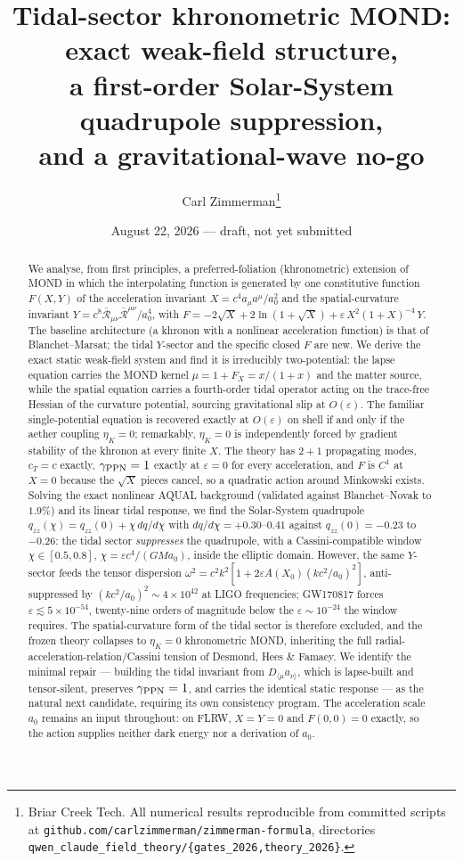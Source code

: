 \documentclass[11pt]{article}
\title{Tidal-sector khronometric MOND: exact weak-field structure,\\
a first-order Solar-System quadrupole suppression,\\
and a gravitational-wave no-go}
\author{Carl Zimmerman\thanks{Briar Creek Tech. All numerical results reproducible from
committed scripts at \texttt{github.com/carlzimmerman/zimmerman-formula},
directories \texttt{qwen\_claude\_field\_theory/\{gates\_2026,theory\_2026\}}.}}
\date{August 22, 2026 --- draft, not yet submitted}
\begin{document}
\maketitle

\begin{abstract}
We analyse, from first principles, a preferred-foliation (khronometric) extension of MOND
in which the interpolating function is generated by one constitutive function
$F(X,Y)$ of the acceleration invariant $X=c^4 a_\mu a^\mu/a_0^2$ and the spatial-curvature
invariant $Y=c^8\bar{\mathcal R}_{\mu\nu}\bar{\mathcal R}^{\mu\nu}/a_0^4$, with
$F=-2\sqrt X+2\ln(1+\sqrt X)+\varepsilon\,X^2(1+X)^{-4}\,Y$.
The baseline architecture (a khronon with a nonlinear acceleration function) is that of
Blanchet--Marsat; the tidal $Y$-sector and the specific closed $F$ are new.
We derive the exact static weak-field system and find it is irreducibly two-potential:
the lapse equation carries the MOND kernel $\mu=1+F_X=x/(1+x)$ and the matter source,
while the spatial equation carries a fourth-order tidal operator acting on the trace-free
Hessian of the curvature potential, sourcing gravitational slip at $O(\varepsilon)$.
The familiar single-potential equation is recovered exactly at $O(\varepsilon)$ on shell
if and only if the aether coupling $\eta_K=0$; remarkably, $\eta_K=0$ is independently
forced by gradient stability of the khronon at every finite $X$.
The theory has $2+1$ propagating modes, $c_T=c$ exactly, $\gamma_{\rm PPN}=1$ exactly at
$\varepsilon=0$ for every acceleration, and $F$ is $C^1$ at $X=0$ because the
$\sqrt X$ pieces cancel, so a quadratic action around Minkowski exists.
Solving the exact nonlinear AQUAL background (validated against Blanchet--Novak to
$1.9\%$) and its linear tidal response, we find the Solar-System quadrupole
$q_{zz}(\chi)=q_{zz}(0)+\chi\,dq/d\chi$ with $dq/d\chi=+0.30$--$0.41$ against
$q_{zz}(0)=-0.23$ to $-0.26$: the tidal sector \emph{suppresses} the quadrupole, with a
Cassini-compatible window $\chi\in[0.5,0.8]$, $\chi=\varepsilon c^4/(GMa_0)$, inside the
elliptic domain. However, the same $Y$-sector feeds the tensor dispersion
$\omega^2=c^2k^2[1+2\varepsilon A(X_0)(kc^2/a_0)^2]$, anti-suppressed by
$(kc^2/a_0)^2\sim4\times10^{42}$ at LIGO frequencies; GW170817 forces
$\varepsilon\lesssim5\times10^{-54}$, twenty-nine orders of magnitude below the
$\varepsilon\sim10^{-24}$ the window requires. The spatial-curvature form of the tidal
sector is therefore excluded, and the frozen theory collapses to $\eta_K=0$ khronometric
MOND, inheriting the full radial-acceleration-relation/Cassini tension of Desmond, Hees
\& Famaey. We identify the minimal repair --- building the tidal invariant from
$D_{\langle\mu}a_{\nu\rangle}$, which is lapse-built and tensor-silent, preserves
$\gamma_{\rm PPN}=1$, and carries the identical static response --- as the natural next
candidate, requiring its own consistency program. The acceleration scale $a_0$ remains an
input throughout: on FLRW, $X=Y=0$ and $F(0,0)=0$ exactly, so the action supplies neither
dark energy nor a derivation of $a_0$.
\end{abstract}
\end{document}
